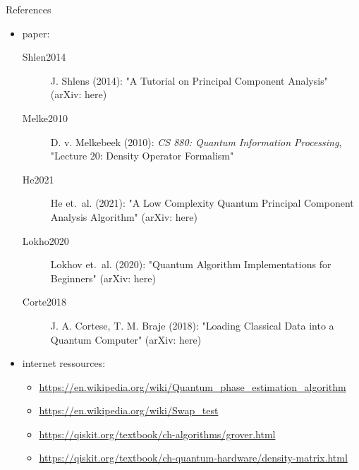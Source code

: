 \begin{frame}{References}
  \begin{minipage}{1.0\textwidth}
    \begin{itemize}
      \item paper:
      \begin{description}
        \item [\text{[}Shlen2014\text{]}] J. Shlens (2014): "A Tutorial on Principal Component Analysis" (arXiv: here)
        \item [\text{[}Melke2010\text{]}] D. v. Melkebeek (2010): \emph{CS 880: Quantum Information Processing}, "Lecture 20: Density Operator Formalism"
        \item [\text{[}He2021\text{]}] He et.~al. (2021): "A Low Complexity Quantum Principal Component Analysis Algorithm" (arXiv: here)
        \item [\text{[}Lokho2020\text{]}] Lokhov et.~al. (2020): "Quantum Algorithm Implementations for Beginners" (arXiv: here)
        \item [\text{[}Corte2018\text{]}] J. A. Cortese, T. M. Braje (2018): "Loading Classical Data into a Quantum Computer" (arXiv: here)
      \end{description}
      \item internet ressources:
      \begin{itemize}
        \item \url{https://en.wikipedia.org/wiki/Quantum_phase_estimation_algorithm}
        \item \url{https://en.wikipedia.org/wiki/Swap_test}
        \item \url{https://qiskit.org/textbook/ch-algorithms/grover.html}
        \item \url{https://qiskit.org/textbook/ch-quantum-hardware/density-matrix.html}
      \end{itemize}
    \end{itemize}
  \end{minipage}
\end{frame}
